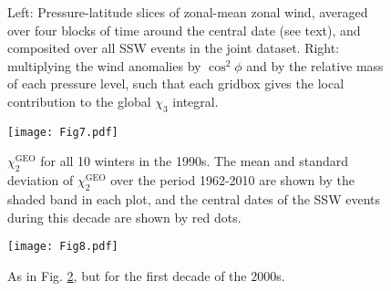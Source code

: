 \documentclass[draft,jgrga]{agutex}
\begin{document}
\begin{figure}
  \noindent
   \caption{ Left: Pressure-latitude slices of zonal-mean zonal wind, averaged over four blocks of time around the central date (see text), and composited over all SSW events in the joint dataset.  Right: multiplying the wind anomalies by $\cos^2 \phi$ and by the relative mass of each pressure level, such that each gridbox gives the local contribution to the global $\chi_3$ integral.
}
   \label{fig:wind_anomaly_composites}
 \end{figure}



\begin{figure}
  \noindent
\texttt{[image: Fig7.pdf]}
   \caption{$\chi_2^{\text{GEO}}$ for all 10 winters in the 1990s.  The mean and standard deviation of $\chi_2^{\text{GEO}}$ over the period 1962-2010 are shown by the shaded band in each plot, and the central dates of the  SSW events during this decade are shown by red dots.}
   \label{fig:X2_1990s}
 \end{figure}


\begin{figure}
  \noindent
\texttt{[image: Fig8.pdf]}
   \caption{As in Fig. \ref{fig:X2_1990s}, but for the first decade of the 2000s.  }
   \label{fig:X2_2000s}
 \end{figure}



%
%

%
%
%
%
%
%


\end{document}
